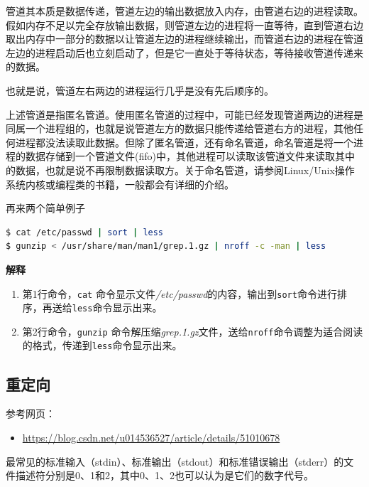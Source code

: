 \documentclass[doctor,openright,twoside]{sjtuthesis}
\providecommand{\tightlist}{%
    \setlength{\itemsep}{0pt}\setlength{\parskip}{0pt}}
\newcommand{\passthrough}[1]{#1}
\theoremstyle{plain}
\theoremstyle{definition}
\theoremstyle{remark}
\theoremstyle{ocrenumbox}
\theoremstyle{plain}
\begin{document}
管道其本质是数据传递，管道左边的输出数据放入内存，由管道右边的进程读取。假如内存不足以完全存放输出数据，则管道左边的进程将一直等待，直到管道右边取出内存中一部分的数据以让管道左边的进程继续输出，而管道右边的进程在管道左边的进程启动后也立刻启动了，但是它一直处于等待状态，等待接收管道传递来的数据。

也就是说，管道左右两边的进程运行几乎是没有先后顺序的。

上述管道是指匿名管道。使用匿名管道的过程中，可能已经发现管道两边的进程是同属一个进程组的，也就是说管道左方的数据只能传递给管道右方的进程，其他任何进程都没法读取此数据。但除了匿名管道，还有命名管道，命名管道是将一个进程的数据存储到一个管道文件(fifo)中，其他进程可以读取该管道文件来读取其中的数据，也就是说不再限制数据读取方。关于命名管道，请参阅Linux/Unix操作系统内核或编程类的书籍，一般都会有详细的介绍。

再来两个简单例子

\begin{lstlisting}[language=bash]
$ cat /etc/passwd | sort | less
$ gunzip < /usr/share/man/man1/grep.1.gz | nroff -c -man | less
\end{lstlisting}

\textbf{解释}

\begin{enumerate}
\def\labelenumi{\arabic{enumi}.}
\tightlist
\item
  第1行命令，\passthrough{\lstinline!cat!} 命令显示文件\emph{/etc/passwd}的内容，输出到\passthrough{\lstinline!sort!}命令进行排序，再送给\passthrough{\lstinline!less!}命令显示出来。
\item
  第2行命令，\passthrough{\lstinline!gunzip!} 命令解压缩\emph{grep.1.gz}文件，送给\passthrough{\lstinline!nroff!}命令调整为适合阅读的格式，传递到\passthrough{\lstinline!less!}命令显示出来。
\end{enumerate}

\hypertarget{sec:redirect}{%
\subsection{重定向}\label{sec:redirect}}

参考网页：

\begin{itemize}
\tightlist
\item
  \url{https://blog.csdn.net/u014536527/article/details/51010678}
\end{itemize}

最常见的标准输入（stdin）、标准输出（stdout）和标准错误输出（stderr）的文件描述符分别是0、1和2，其中0、1、2也可以认为是它们的数字代号。
\end{document}
